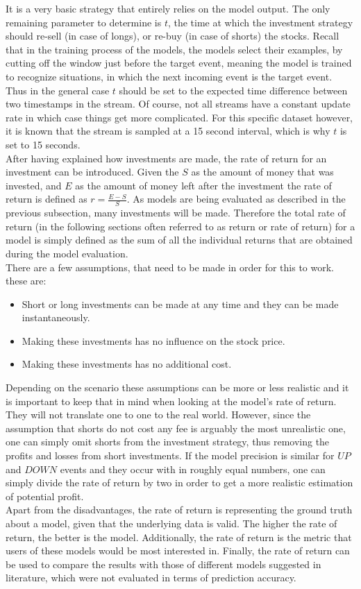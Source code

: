 It is a very basic strategy that entirely relies on the model output. The only remaining parameter to determine is $t$, the time at which the investment strategy should re-sell (in case of longs), or re-buy (in case of shorts) the stocks. Recall that in the training process of the models, the models select their examples, by cutting off the window just before the target event, meaning the model is trained to recognize situations, in which the next incoming event is the target event. Thus in the general case $t$ should be set to the expected time difference between two timestamps in the stream. Of course, not all streams have a constant update rate in which case things get more complicated. For this specific dataset however, it is known that the stream is sampled at a 15 second interval, which is why $t$ is set to 15 seconds. \\
After having explained how investments are made, the rate of return for an investment can be introduced. Given the $S$ as the amount of money that was invested, and $E$ as the amount of money left after the investment the rate of return is defined as $r = \frac{E-S}{S}$. As models are being evaluated as described in the previous subsection, many investments will be made. Therefore the total rate of return (in the following sections often referred to as return or rate of return) for a model is simply defined as the sum of all the individual returns that are obtained during the model evaluation.\\
There are a few assumptions, that need to be made in order for this to work. these are:

\begin{itemize}
	\item Short or long investments can be made at any time and they can be made instantaneously.
	\item Making these investments has no influence on the stock price.
	\item Making these investments has no additional cost.
\end{itemize}

Depending on the scenario these assumptions can be more or less realistic and it is important to keep that in mind when looking at the model's rate of return. They will not translate one to one to the real world. However, since the assumption that shorts do not cost any fee is arguably the most unrealistic one, one can simply omit shorts from the investment strategy, thus removing the profits and losses from short investments. If the model precision is similar for $UP$ and $DOWN$ events and they occur with in roughly equal numbers, one can simply divide the rate of return by two in order to get a more realistic estimation of potential profit.\\
Apart from the disadvantages, the rate of return is representing the ground truth about a model, given that the underlying data is valid. The higher the rate of return, the better is the model. Additionally, the rate of return is the metric that users of these models would be most interested in. Finally, the rate of return can be used to compare the results with those of different models suggested in literature, which were not evaluated in terms of prediction accuracy.

